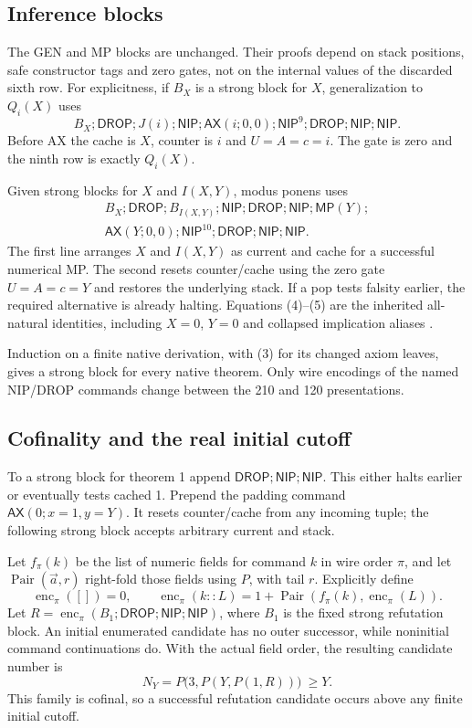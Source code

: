 \documentclass[11pt,a4paper]{article}
\theoremstyle{remark}\newtheorem{remark}[theorem]{Remark}
\newcommand{\AX}{\mathsf{AX}}
\newcommand{\MP}{\mathsf{MP}}
\newcommand{\DROP}{\mathsf{DROP}}
\newcommand{\NIP}{\mathsf{NIP}}
\begin{document}
\subsection{Inference blocks}

The GEN and MP blocks are unchanged. Their proofs depend on stack
positions, safe constructor tags and zero gates, not on the internal
values of the discarded sixth row. For explicitness, if $B_X$
is a strong block for $X$, generalization to $Q_i(X)$ uses
\[
 B_X;\DROP;J(i);\NIP;\AX(i;0,0);
 \NIP^9;\DROP;\NIP;\NIP.                         \tag{4}
\]
Before AX the cache is $X$, counter is $i$ and $U=A=c=i$.
The gate is zero and the ninth row is exactly $Q_i(X)$.

Given strong blocks for $X$ and $I(X,Y)$, modus ponens uses
\begin{align*}
 B_X;\DROP;B_{I(X,Y)};\NIP;\DROP;\NIP;\MP(Y);\\
 \AX(Y;0,0);\NIP^{10};\DROP;\NIP;\NIP.            \tag{5}
\end{align*}
The first line arranges $X$ and $I(X,Y)$ as current and cache
for a successful numerical MP. The second resets counter/cache
using the zero gate $U=A=c=Y$ and restores the underlying stack.
If a pop tests falsity earlier, the required alternative is already
halting. Equations (4)--(5) are the inherited all-natural identities,
including $X=0$, $Y=0$ and collapsed implication aliases
\cite{commands}.

Induction on a finite native derivation, with (3) for its changed
axiom leaves, gives a strong block for every native theorem.
Only wire encodings of the named NIP/DROP commands change between
the 210 and 120 presentations.

\subsection{Cofinality and the real initial cutoff}

To a strong block for theorem 1 append
$\DROP;\NIP;\NIP$. This either halts earlier or eventually tests
cached 1. Prepend the padding command
$\AX(0;x=1,y=Y)$. It resets counter/cache from any incoming tuple;
the following strong block accepts arbitrary current and stack.

Let $f_\pi(k)$ be the list of numeric fields for command $k$ in
wire order $\pi$, and let $\operatorname{Pair}(\vec a,r)$ right-fold
those fields using $P$, with tail $r$. Explicitly define
\[
 \operatorname{enc}_\pi([])=0,\qquad
 \operatorname{enc}_\pi(k::L)=
 1+\operatorname{Pair}(f_\pi(k),\operatorname{enc}_\pi(L)).
\]
Let $R=\operatorname{enc}_\pi(B_1;\DROP;\NIP;\NIP)$, where $B_1$
is the fixed strong refutation block. An initial enumerated candidate
has no outer successor, while noninitial command continuations do.
With the actual field order, the resulting candidate number is
\[
 N_Y=P\bigl(3,P(Y,P(1,R))\bigr)\ \ge Y.           \tag{6}
\]
This family is cofinal, so a successful refutation candidate occurs
above any finite initial cutoff.
\end{document}
